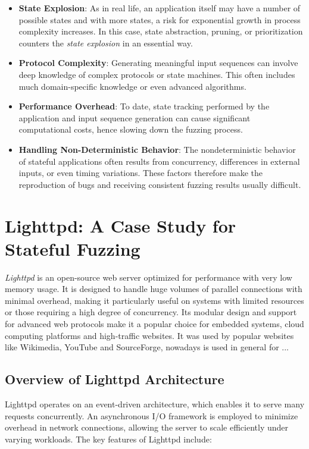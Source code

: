 \begin{itemize}
    \item \textbf{State Explosion}: As in real life, an application itself may have a number of possible states and with more states, a risk for exponential growth in process complexity increases. In this case, state abstraction, pruning, or prioritization counters the \textit{state explosion} in an essential way.
    
    \item \textbf{Protocol Complexity}: Generating meaningful input sequences can involve deep knowledge of complex protocols or state machines. This often includes much domain-specific knowledge or even advanced algorithms.
    
    \item \textbf{Performance Overhead}: To date, state tracking performed by the application and input sequence generation can cause significant computational costs, hence slowing down the fuzzing process.

    \item \textbf{Handling Non-Deterministic Behavior}: The nondeterministic behavior of stateful applications often results from concurrency, differences in external inputs, or even timing variations. These factors therefore make the reproduction of bugs and receiving consistent fuzzing results usually difficult.

\end{itemize}

\section{Lighttpd: A Case Study for Stateful Fuzzing}
\textit{Lighttpd} is an open-source web server optimized for performance with very low memory usage. It is designed to handle huge volumes of parallel connections with minimal overhead, making it particularly useful on systems with limited resources or those requiring a high degree of concurrency. Its modular design and support for advanced web protocols make it a popular choice for embedded systems, cloud computing platforms and high-traffic websites. It was used by popular websites like Wikimedia, YouTube and SourceForge, nowadays is used in general for ...%

\subsection{Overview of Lighttpd Architecture}
Lighttpd operates on an event-driven architecture, which enables it to serve many requests concurrently. An asynchronous I/O framework is employed to minimize overhead in network connections, allowing the server to scale efficiently under varying workloads. The key features of Lighttpd include:

